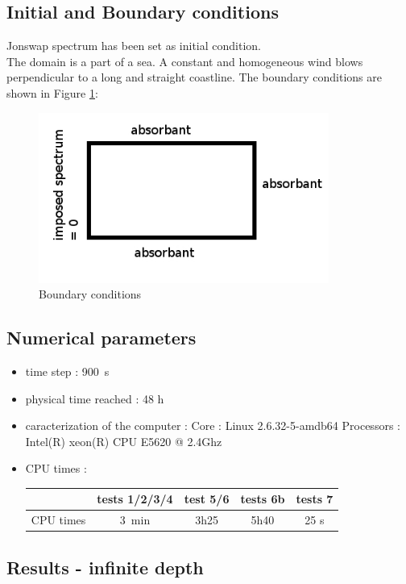 \subsection{Initial and Boundary conditions}
Jonswap spectrum has been set as initial condition.\\
The domain is a part of a sea. A constant and homogeneous wind blows perpendicular to a long and straight coastline. The boundary conditions are shown in Figure \ref{boundaryfet}:
\begin{figure}
\centering
\includegraphics[width=0.85\textwidth]{boundarycond.jpg}
\caption{Boundary conditions}
\label{boundaryfet}
\end{figure}
\subsection{Numerical parameters}
\begin{itemize}
\item time step : 900~s
\item physical time reached : 48 h
\item caracterization of the computer : \subitem Core : Linux 2.6.32-5-amdb64 \subitem Processors : Intel(R)
xeon(R) CPU E5620 @ 2.4Ghz
\item CPU times : \\
\begin{tabular}{c|c|c|c|c}
 & tests 1/2/3/4 & test 5/6 &tests 6b & tests 7\\
 \hline
CPU times & 3~min & 3h25 & 5h40 & 25 s \\
\end{tabular}
\end{itemize}

\subsection{Results - infinite depth }
